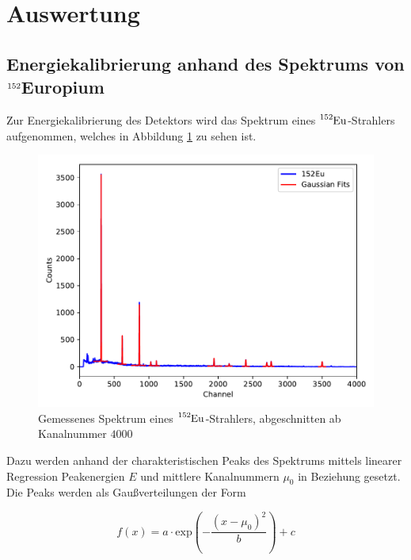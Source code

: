\section{Auswertung}
\label{sec:Auswertung}


\subsection{Energiekalibrierung anhand des Spektrums von $\ce{^{152}}$Europium}

Zur Energiekalibrierung des Detektors wird das Spektrum eines $\ce{^{152}Eu}$-Strahlers aufgenommen, welches in Abbildung
\ref{fig:plot1} zu sehen ist.

\begin{figure}
  \centering
  \includegraphics[scale=0.7]{content/plot1.pdf}
  \caption{Gemessenes Spektrum eines $\ce{^{152}Eu}$-Strahlers, abgeschnitten ab Kanalnummer $\num{4000}$}
  \label{fig:plot1}
\end{figure}

Dazu werden anhand der charakteristischen Peaks des Spektrums mittels linearer Regression Peakenergien $E$ und mittlere 
Kanalnummern $\mu_0$ in Beziehung gesetzt.
Die Peaks werden als Gaußverteilungen der Form 

\begin{equation}
  f(x) = a \cdot \text{exp}\left( - \frac{(x-\mu_0)^2}{b}\right) + c
  \label{eqn:gauss}
\end{equation}


